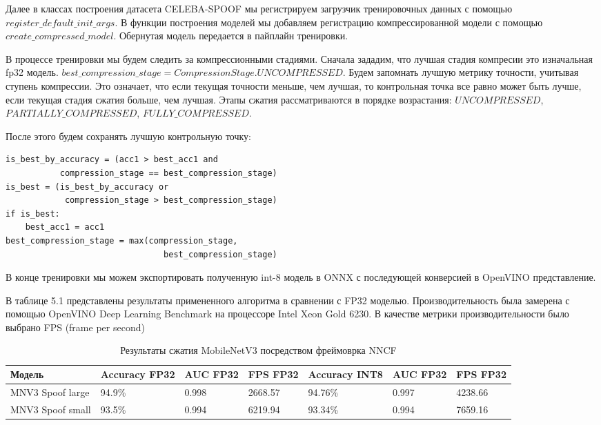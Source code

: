 \documentclass[oneside,final,12pt]{extreport}
\begin{document}
Далее в классах построения датасета CELEBA-SPOOF мы регистрируем загрузчик тренировочных данных  с помощью $register\_default\_init\_args$. В функции построения моделей мы добавляем регистрацию компрессированной модели с помощью $create\_compressed\_model$. Обернутая модель передается в пайплайн тренировки. 

В процессе тренировки мы будем следить за компрессионными стадиями. Сначала зададим, что лучшая стадия компресии это изначальная fp32 модель. $best\_compression\_stage = CompressionStage.UNCOMPRESSED$. Будем запомнать лучшую метрику точности, учитывая ступень компрессии. Это означает, что если текущая точности меньше, чем лучшая, то контрольная точка все равно может быть лучше, если текущая стадия сжатия больше, чем лучшая. Этапы сжатия рассматриваются в порядке возрастания: $UNCOMPRESSED$, $PARTIALLY\_COMPRESSED$, $FULLY\_COMPRESSED.$

После этого будем сохранять лучшую контрольную точку:

\lstset{language=Python}
\begin{lstlisting}
is_best_by_accuracy = (acc1 > best_acc1 and 
           compression_stage == best_compression_stage)
is_best = (is_best_by_accuracy or 
            compression_stage > best_compression_stage)
if is_best:
    best_acc1 = acc1
best_compression_stage = max(compression_stage, 
                                best_compression_stage)
\end{lstlisting}

В конце тренировки мы можем экспортировать полученную int-8 модель в ONNX с последующей конверсией в OpenVINO представление.

В таблице 5.1 представлены результаты примененного алгоритма в сравнении с FP32 моделью. Производительность была замерена с помощью OpenVINO Deep Learning Benchmark на процессоре Intel Xeon Gold 6230. В качестве метрики производительности было выбрано FPS (frame per second)

\begin{table}[H]
\caption{Результаты сжатия MobileNetV3 посредством фреймоврка NNCF}
\label{table_4.1}
\begin{tabularx}{\textwidth}{|X|X|X|X|X|X|X|} %
\hline
Модель & Accuracy FP32 & AUC FP32 &  FPS FP32 & Accuracy INT8 & AUC FP32 &  FPS FP32 \\ \hline
MNV3 Spoof large & 94.9\% & 0.998 &  2668.57 & 94.76\% & 0.997 & 4238.66 \\ \hline
MNV3 Spoof small & 93.5\% & 0.994 &  6219.94 & 93.34\% & 0.994 & 7659.16 \\ \hline
\end{tabularx}
\end{table}
\end{document}
